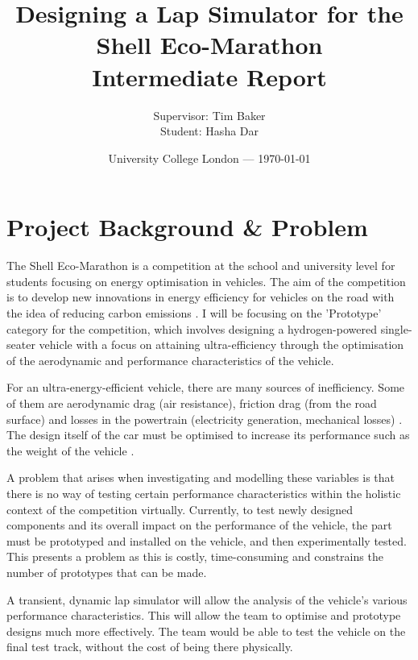 \documentclass{article}
\title{Designing a Lap Simulator for the Shell Eco-Marathon\\Intermediate Report} %
\author{Supervisor: Tim Baker\\Student: Hasha Dar} %
\date{University College London --- \today} %
\begin{document}
\maketitle %

\section{Project Background \& Problem}
The Shell Eco-Marathon is a competition at the school and university level for students focusing on energy optimisation in vehicles. The aim of the competition is to develop new innovations in energy efficiency for vehicles on the road with the idea of reducing carbon emissions \citep{ShellEco2021}. I will be focusing on the 'Prototype' category for the competition, which involves designing a hydrogen-powered single-seater vehicle with a focus on attaining ultra-efficiency through the optimisation of the aerodynamic and performance characteristics of the vehicle.

For an ultra-energy-efficient vehicle, there are many sources of inefficiency. Some of them are aerodynamic drag (air resistance), friction drag (from the road surface) and losses in the powertrain (electricity generation, mechanical losses) \citep{Wei2019}. The design itself of the car must be optimised to increase its performance such as the weight of the vehicle \citep{Tsirogiannis2019}.

A problem that arises when investigating and modelling these variables is that there is no way of testing certain performance characteristics within the holistic context of the competition virtually. Currently, to test newly designed components and its overall impact on the performance of the vehicle, the part must be prototyped and installed on the vehicle, and then experimentally tested. This presents a problem as this is costly, time-consuming and constrains the number of prototypes that can be made.

A transient, dynamic lap simulator will allow the analysis of the vehicle's various performance characteristics. This will allow the team to optimise and prototype designs much more effectively. The team would be able to test the vehicle on the final test track, without the cost of being there physically.
\end{document}
